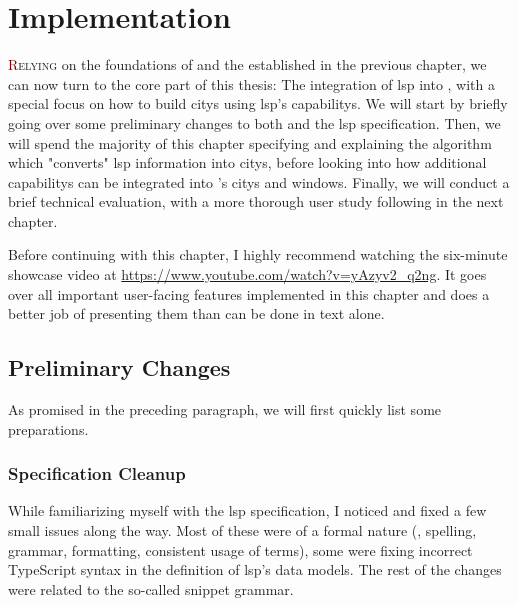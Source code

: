 \documentclass[../thesis]{subfiles}
\begin{document}
\chapter{Implementation}\label{ch:implementation}

\lettrine[lines=3]{\textcolor{Maroon}{R}}{elying} on the foundations of \SEE{} and the  established in the previous chapter, we can now turn to the core part of this thesis:
The integration of \gls{lsp} into \SEE{}, with a special focus on how to build \glspl{city} using \gls{lsp}'s \glspl{capability}.
We will start by briefly going over some preliminary changes to both \SEE{} and the \gls{lsp} specification.
Then, we will spend the majority of this chapter specifying and explaining the algorithm which "converts" \gls{lsp} information into \glspl{city}, before looking into how additional \glspl{capability} can be integrated into \SEE{}'s \glspl{city} and \glspl{window}.
Finally, we will conduct a brief technical evaluation, with a more thorough user study following in the next chapter.


Before continuing with this chapter, I highly recommend watching the six-minute showcase video at \url{https://www.youtube.com/watch?v=yAzyv2_q2ng}.
It goes over all important user-facing features implemented in this chapter and does a better job of presenting them than can be done in text alone.

\section{Preliminary Changes}
As promised in the preceding paragraph, we will first quickly list some preparations.

\subsection{Specification Cleanup}
While familiarizing myself with the \gls{lsp} specification, I noticed and fixed a few small issues along the way.
Most of these were of a formal nature (\eg, spelling, grammar, formatting, consistent usage of terms), some were fixing incorrect TypeScript syntax in the definition of \gls{lsp}'s data models.
The rest of the changes were related to the so-called snippet grammar.
\end{document}
